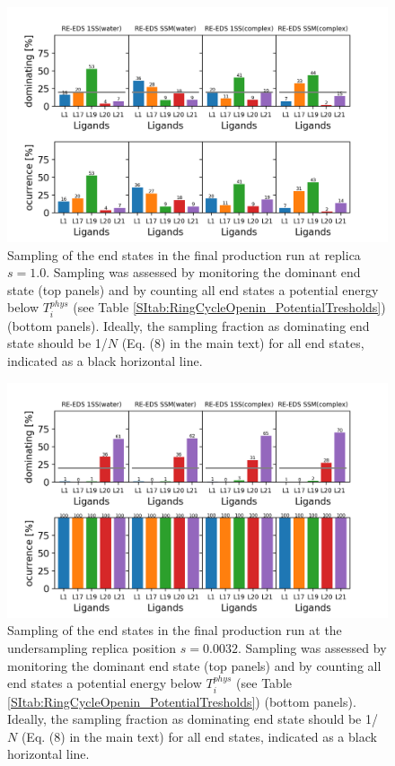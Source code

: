 \begin{figure}[h]
\centering
\includegraphics[width=\linewidth]{fig/results/ringOpening/FE/Reeds_RingOpening_production_sampling_s1.png}
\caption{Sampling of the end states in the final production run at replica $s=1.0$. Sampling was assessed by monitoring the dominant end state (top panels) and by counting all end states a potential energy below $T_{i}^{phys}$ (see Table \ref{SItab:RingCycleOpenin_PotentialTresholds}) (bottom panels). Ideally, the sampling fraction as dominating end state should be 1/$N$ (Eq. (8) in the main text) for all end states, indicated as a black horizontal line.}
\label{SIfig:CHK1_RingOpening_soptimization_final_Sampling_s1}
\end{figure}

\begin{figure}[h]
\centering
\includegraphics[width=\linewidth]{fig/results/ringOpening/FE/Reeds_RingOpening_production_sampling_underS.png}
\caption{Sampling of the end states in the final production run at the undersampling replica position $s=0.0032$. Sampling was assessed by monitoring the dominant end state (top panels) and by counting all end states a potential energy below $T_{i}^{phys}$ (see Table \ref{SItab:RingCycleOpenin_PotentialTresholds}) (bottom panels). Ideally, the sampling fraction as dominating end state should be 1/$N$ (Eq. (8) in the main text) for all end states, indicated as a black horizontal line.}
\label{SIfig:CHK1_RingOpening_soptimization_final_Sampling_undersampling}
\end{figure}

